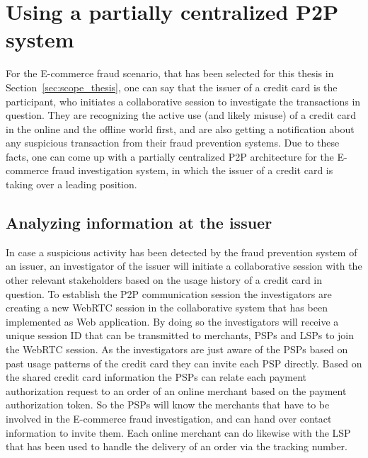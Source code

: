 
\section{Using a partially centralized \gls{P2P} system}
\label{sec:p2p_partially_centralized_system}

For the \gls{E-commerce} fraud scenario, that has been selected for this thesis in Section~\ref{sec:scope_thesis}, one can say that the issuer of a credit card is the participant, who initiates a collaborative session to investigate the transactions in question. They are recognizing the active use (and likely misuse) of a credit card in the online and the offline world first, and are also getting a notification about any suspicious transaction from their fraud prevention systems. Due to these facts, one can come up with a partially centralized \gls{P2P} architecture for the \gls{E-commerce} fraud investigation system, in which the issuer of a credit card is taking over a leading position.

\subsection{Analyzing information at the issuer}
\label{subsec:p2p_partially_issuer_collecting}

In case a suspicious activity has been detected by the fraud prevention system of an issuer, an investigator of the issuer will initiate a collaborative session with the other relevant stakeholders based on the usage history of a credit card in question. To establish the \gls{P2P} communication session the investigators are creating a new \gls{WebRTC} session in the collaborative system that has been implemented as Web application. By doing so the investigators will receive a unique session ID that can be transmitted to merchants, \gls{PSP}s and \gls{LSP}s to join the \gls{WebRTC} session. As the investigators are just aware of the \gls{PSP}s based on past usage patterns of the credit card they can invite each \gls{PSP} directly. Based on the shared credit card information the \gls{PSP}s can relate each payment authorization request to an order of an online merchant based on the payment authorization token. So the \gls{PSP}s will know the merchants that have to be involved in the \gls{E-commerce} fraud investigation, and can hand over contact information to invite them. Each online merchant can do likewise with the \gls{LSP} that has been used to handle the delivery of an order via the tracking number. \\

